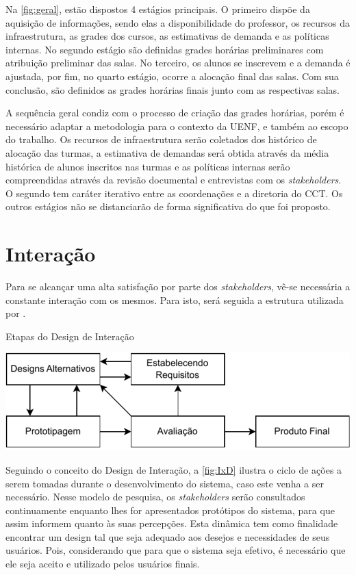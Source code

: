 Na \autoref{fig:geral}, estão dispostos 4 estágios principais. O primeiro dispõe da aquisição de informações, sendo elas a disponibilidade do professor, os recursos da infraestrutura, as grades dos cursos, as estimativas de demanda e as políticas internas. No segundo estágio são definidas grades horárias preliminares com atribuição preliminar das salas. No terceiro, os alunos se inscrevem e a demanda é ajustada, por fim, no quarto estágio, ocorre a alocação final das salas. Com sua conclusão, são definidos as grades horárias finais junto com as respectivas salas.

A sequência geral condiz com o processo de criação das grades horárias, porém é necessário adaptar a metodologia para o contexto da UENF, e também ao escopo do trabalho. Os recursos de infraestrutura serão coletados dos histórico de alocação das turmas, a estimativa de demandas será obtida através da média histórica de alunos inscritos nas turmas e as políticas internas serão compreendidas através da revisão documental e entrevistas com os \textit{stakeholders}. O segundo tem caráter iterativo entre as coordenações e a diretoria do CCT. Os outros estágios não se distanciarão de forma significativa do que foi proposto.

\section{Interação} \label{sec:interacao} %

Para se alcançar uma alta satisfação por parte dos \textit{stakeholders}, vê-se necessária a constante interação com os mesmos. Para isto, será seguida a estrutura utilizada por .

\begin{CenteredFigure} \caption{Etapas do Design de Interação} \label{fig:IxD}
  \includegraphics{files/img/2.02!4-modelagem/Arquitetura-IxD}
\end{CenteredFigure}

Seguindo o conceito do Design de Interação, a \autoref{fig:IxD} ilustra o ciclo de ações a serem tomadas durante o desenvolvimento do sistema, caso este venha a ser necessário. Nesse modelo de pesquisa, os \textit{stakeholders} serão consultados continuamente enquanto lhes for apresentados protótipos do sistema, para que assim informem quanto às suas percepções. Esta dinâmica tem como finalidade encontrar um design tal que seja adequado aos desejos e necessidades de seus usuários. Pois, considerando que para que o sistema seja efetivo, é necessário que ele seja aceito e utilizado pelos usuários finais.

